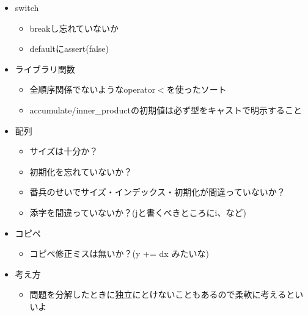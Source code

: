 \begin{itemize}
\item{switch}
\begin{itemize}
\item{breakし忘れていないか}
\item{defaultにassert(false)}
\end{itemize}
\item{ライブラリ関数}
\begin{itemize}
\item{全順序関係でないようなoperator$<$を使ったソート}
\item{accumulate/inner\_productの初期値は必ず型をキャストで明示すること}
\end{itemize}
\item{配列}
\begin{itemize}
\item{サイズは十分か？}
\item{初期化を忘れていないか？}
\item{番兵のせいでサイズ・インデックス・初期化が間違っていないか？}
\item{添字を間違っていないか？(jと書くべきところにi、など)}
\end{itemize}
\item{コピペ}
\begin{itemize}
\item{コピペ修正ミスは無いか？(y += dx みたいな)}
\end{itemize}
\item{考え方}
\begin{itemize}
\item{問題を分解したときに独立にとけないこともあるので柔軟に考えるといいよ}
\end{itemize}
\end{itemize}




\newpage

